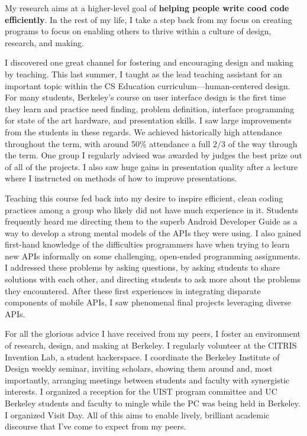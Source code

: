 \documentclass[12pt]{memoir}
\begin{document}

My research aims at a higher-level goal of \textbf{helping people write cood code efficiently}.
In the rest of my life, I take a step back from my focus on creating programs to focus on enabling others to thrive within a culture of design, research, and making.

I discovered one great channel for fostering and encouraging design and making by teaching.
This last summer, I taught as the lead teaching assistant for an important topic within the CS Education curriculum---human-centered design.
For many students, Berkeley's course on user interface design is the first time they learn and practice need finding, problem definition, interface programming for state of the art hardware, and presentation skills.
I saw large improvements from the students in these regards.
We achieved historically high attendance throughout the term, with around 50\% attendance a full 2/3 of the way through the term.
One group I regularly advised was awarded by judges the best prize out of all of the projects.
I also saw huge gains in presentation quality after a lecture where I instructed on methods of how to improve presentations.

Teaching this course fed back into my desire to inspire efficient, clean coding practices among a group who likely did not have much experience in it.
Students frequently heard me directing them to the superb Android Developer Guide as a way to develop a strong mental models of the APIs they were using.
I also gained first-hand knowledge of the difficulties programmers have when trying to learn new APIs informally on some challenging, open-ended programming assignments.
I addressed these problems by asking questions, by asking students to share solutions with each other, and directing students to ask more about the problems they encountered.
After these first experiences in integrating disparate components of mobile APIs, I saw phenomenal final projects leveraging diverse APIs.

For all the glorious advice I have received from my peers, I foster an environment of research, design, and making at Berkeley.
I regularly volunteer at the CITRIS Invention Lab, a student hackerspace.
I coordinate the Berkeley Institute of Design weekly seminar, inviting scholars, showing them around and, most importantly, arranging meetings between students and faculty with synergistic interests.
I organized a reception for the UIST program committee and UC Berkeley students and faculty to mingle while the PC was being held in Berkeley.
I organized Visit Day.
All of this aims to enable lively, brilliant academic discourse that I've come to expect from my peers.
\end{document}
